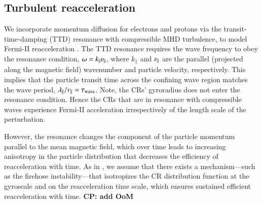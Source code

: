 \documentclass[fleqn,usenatbib,useAMS]{mnras}
\def\CP#1{{\bf {\color{mygreen} CP: #1}}}
\begin{document}
\subsection{Turbulent reacceleration}
We incorporate momentum diffusion for electrons and protons via the
transit-time-damping (TTD) resonance with compressible MHD turbulence,
to model Fermi-II reacceleration \citep{brunetti07,brunetti11}. The
TTD resonance requires the wave frequency to obey the resonance
condition, $\omega=k_\parallel\varv_\parallel$, where $k_\parallel$
and $\varv_\parallel$ are the parallel (projected along the magnetic
field) wavenumber and particle velocity, respectively. This implies
that the particle transit time across the confining wave region
matches the wave period,
$\lambda_{\parallel}/v_{\parallel}=\tau_{{\mathrm{wave}}}$. Note, the CRs'
gyroradius does not enter the resonance condition. Hence the CRs that
are in resonance with compressible waves experience Fermi-II
acceleration irrespectively of the length scale of the perturbation.

However, the resonance changes the component of the particle momentum
parallel to the mean magnetic field, which over time leads to
increasing anisotropy in the particle distribution that decreases the
efficiency of reacceleration with time. As in \citet{brunetti11}, we
assume that there exists a mechanism---such as the firehose
instability---that isotropizes the CR distribution function at the
gyroscale and on the reacceleration time scale, which ensures
sustained efficient reacceleration with time.
\CP{add OoM}
\end{document}
